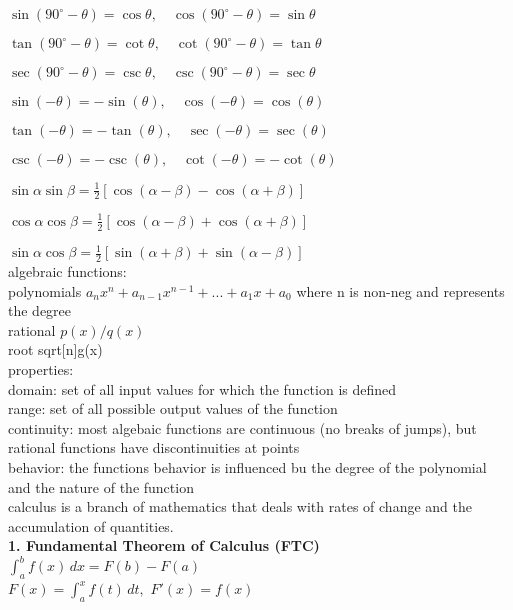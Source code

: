 \documentclass{article}
\begin{document}
$ \sin(90^\circ - \theta) = \cos \theta, \quad \cos(90^\circ - \theta) = \sin \theta $

$ \tan(90^\circ - \theta) = \cot \theta, \quad \cot(90^\circ - \theta) = \tan \theta $

$ \sec(90^\circ - \theta) = \csc \theta, \quad \csc(90^\circ - \theta) = \sec \theta $

$ \sin(-\theta) = -\sin(\theta), \quad \cos(-\theta) = \cos(\theta) $

$ \tan(-\theta) = -\tan(\theta), \quad \sec(-\theta) = \sec(\theta) $

$ \csc(-\theta) = -\csc(\theta), \quad \cot(-\theta) = -\cot(\theta) $

$ \sin \alpha \sin \beta = \frac{1}{2} [\cos(\alpha - \beta) - \cos(\alpha + \beta)] $

$ \cos \alpha \cos \beta = \frac{1}{2} [\cos(\alpha - \beta) + \cos(\alpha + \beta)] $

$ \sin \alpha \cos \beta = \frac{1}{2} [\sin(\alpha + \beta) + \sin(\alpha - \beta)] $ \\
	

algebraic functions:\\
	polynomials $a_nx^n + a_{n-1}x^{n-1} + ... + a_1x + a_0$ where n is non-neg and represents the degree\\
	rational $p(x)/q(x)$\\
	root sqrt[n]{g(x)}\\

	properties:\\
		domain: set of all input values for which the function is defined\\
		range: set of all possible output values of the function\\
	
		continuity: most algebaic functions are continuous (no breaks of jumps), but rational functions have discontinuities at points\\
		
		behavior: the functions behavior is influenced bu the degree of the polynomial and the nature of the function\\

calculus is a branch of mathematics that deals with rates of change and the accumulation of quantities.\\

\textbf{1. Fundamental Theorem of Calculus (FTC)} \\
 \quad $\int_{a}^{b} f(x) \, dx = F(b) - F(a)$  \\
 \quad {} $F(x) = \int_a^x f(t) \, dt,$  $F'(x) = f(x)$  \\
\end{document}
